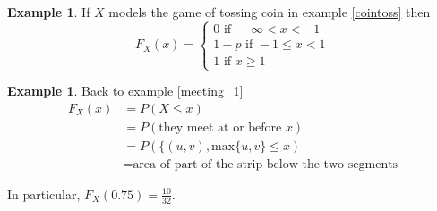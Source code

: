\documentclass[12pt]{amsart}
\theoremstyle{definition}
\newtheorem{example}[theorem]{Example}
\begin{document}
\begin{example} \label{cointoss1} If $X$ models the game of tossing coin in example \ref{cointoss} then
$$F_X(x) = \begin{cases} 0 \text{ if } -\infty < x < -1 \\ 1 - p \text{ if } -1 \leq x < 1 \\ 1 \text{ if } x \geq 1 \end{cases}$$ 
\end{example}
\begin{example} Back to example \ref{meeting_1}
\begin{align*}
F_X(x) & = P(X \leq x) \\
 & = P(\text{they meet at or before }x) \\
 & = P(\{(u, v), \text{max}\{u,v\} \leq x) \\
 & = \text{area of part of the strip below the two segments}
\end{align*}

In particular, $F_X(0.75) = \frac{10}{32}$.
\end{example}
\end{document}
